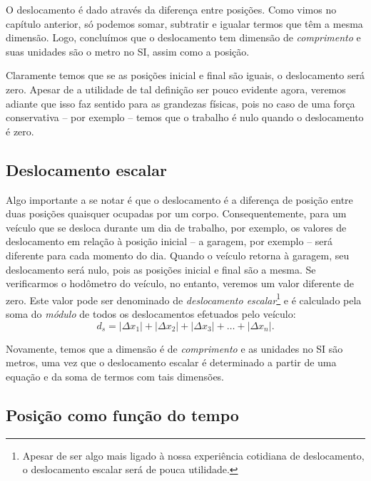 O deslocamento é dado através da diferença entre posições. Como vimos no capítulo anterior, só podemos somar, subtratir e igualar termos que têm a mesma dimensão. Logo, concluímos que o deslocamento tem dimensão de \emph{comprimento} e suas unidades são o metro no SI, assim como a posição.

Claramente temos que se as posições inicial e final são iguais, o deslocamento será zero. Apesar de a utilidade de tal definição ser pouco evidente agora, veremos adiante que isso faz sentido para as grandezas físicas, pois no caso de uma força conservativa -- por exemplo -- temos que o trabalho é nulo quando o deslocamento é zero.

\subsection{Deslocamento escalar}

Algo importante a se notar é que o deslocamento é a diferença de posição entre duas posições quaisquer ocupadas por um corpo. Consequentemente, para um veículo que se desloca durante um dia de trabalho, por exemplo, os valores de deslocamento em relação à posição inicial -- a garagem, por exemplo -- será diferente para cada momento do dia. Quando o veículo retorna à garagem, seu deslocamento será nulo, pois as posições inicial e final são a mesma. Se verificarmos o hodômetro do veículo, no entanto, veremos um valor diferente de zero. Este valor pode ser denominado de \emph{deslocamento escalar}\footnote{Apesar de ser algo mais ligado à nossa experiência cotidiana de deslocamento, o deslocamento escalar será de pouca utilidade.} e é calculado pela soma do \emph{módulo} de todos os deslocamentos efetuados pelo veículo:
\begin{equation}
  d_s = |\Delta x_1| + |\Delta x_2| + |\Delta x_3| + \dots + |\Delta x_n|.
\end{equation}

Novamente, temos que a dimensão é de \emph{comprimento} e as unidades no SI são metros, uma vez que o deslocamento escalar é determinado a partir de uma equação e da soma de termos com tais dimensões.


\subsection{Posição como função do tempo}

